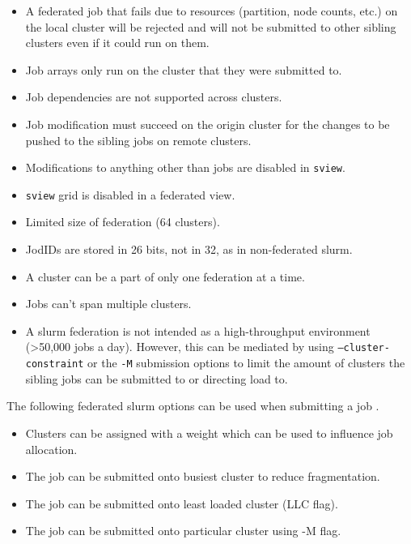 \documentclass[conference]{IEEEtran}
\begin{document}
\begin{itemize}
    \item A federated job that fails due to resources (partition, node counts, etc.) on the local cluster will be rejected and will not be submitted to other sibling clusters even if it could run on them.
    \item Job arrays only run on the cluster that they were submitted to.
    \item Job dependencies are not supported across clusters.
    \item Job modification must succeed on the origin cluster for the changes to be pushed to the sibling jobs on remote clusters.
    \item Modifications to anything other than jobs are disabled in \texttt{sview}.
    \item \texttt{sview} grid is disabled in a federated view.
    \item Limited size of federation (64 clusters).
    \item JodIDs are stored in 26 bits, not in 32, as in non-federated \gls{slurm}.
    \item A cluster can be a part of only one federation at a time.
    \item Jobs can't span multiple clusters.
    \item A \gls{slurm} federation is not intended as a high-throughput environment (\textgreater 50,000 jobs a day). However, this can be mediated by using \texttt{--cluster-constraint} or the \texttt{-M} submission options to limit the amount of clusters the sibling jobs can be submitted to or directing load to.
\end{itemize}

The following federated \gls{slurm} options can be used when submitting a job .

\begin{itemize}
    \item Clusters can be assigned with a weight which can be used to influence job allocation.
    \item The job can be submitted onto busiest cluster to reduce fragmentation.
    \item The job can be submitted onto least loaded cluster (LLC flag).
    \item The job can be submitted onto particular cluster using -M flag.
\end{itemize}
\end{document}
